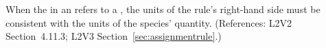 When the  in an \AssignmentRule refers to a \Species, the
units of the rule's right-hand side must be consistent with the units of
the species' quantity.  (References: L2V2 Section~4.11.3;
L2V3 Section~\ref{sec:assignmentrule}.)
